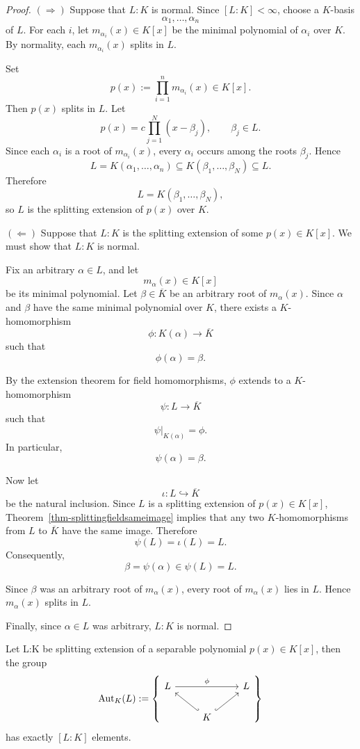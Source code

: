 \begin{proof}
$(\Rightarrow)$
Suppose that $L:K$ is normal. Since $[L:K]<\infty$, choose a
$K$-basis
\[
\alpha_1,\ldots,\alpha_n
\]
of $L$. For each $i$, let $m_{\alpha_i}(x)\in K[x]$ be the minimal
polynomial of $\alpha_i$ over $K$. By normality, each
$m_{\alpha_i}(x)$ splits in $L$.

Set
\[
p(x):=\prod_{i=1}^n m_{\alpha_i}(x)\in K[x].
\]
Then $p(x)$ splits in $L$. Let
\[
p(x)=c\prod_{j=1}^N(x-\beta_j),
\qquad \beta_j\in L.
\]
Since each $\alpha_i$ is a root of $m_{\alpha_i}(x)$, every
$\alpha_i$ occurs among the roots $\beta_j$. Hence
\[
L=K(\alpha_1,\ldots,\alpha_n)
   \subseteq K(\beta_1,\ldots,\beta_N)
   \subseteq L.
\]
Therefore
\[
L=K(\beta_1,\ldots,\beta_N),
\]
so $L$ is the splitting extension of $p(x)$ over $K$.

\medskip

\noindent
$(\Leftarrow)$
Suppose that $L:K$ is the splitting extension of some
$p(x)\in K[x]$. We must show that $L:K$ is normal.

Fix an arbitrary $\alpha\in L$, and let
\[
m_\alpha(x)\in K[x]
\]
be its minimal polynomial. Let $\beta\in\overline K$ be an arbitrary
root of $m_\alpha(x)$. Since $\alpha$ and $\beta$ have the same
minimal polynomial over $K$, there exists a $K$-homomorphism
\[
\phi:K(\alpha)\longrightarrow \overline K
\]
such that
\[
\phi(\alpha)=\beta.
\]

By the extension theorem for field homomorphisms, $\phi$ extends to a
$K$-homomorphism
\[
\psi:L\longrightarrow \overline K
\]
such that
\[
\psi|_{K(\alpha)}=\phi.
\]
In particular,
\[
\psi(\alpha)=\beta.
\]

Now let
\[
\iota:L\hookrightarrow\overline K
\]
be the natural inclusion. Since $L$ is a splitting extension of
$p(x)\in K[x]$, Theorem~\ref{thm-splittingfieldsameimage} implies that
any two $K$-homomorphisms from $L$ to $\overline K$ have the same
image. Therefore
\[
\psi(L)=\iota(L)=L.
\]
Consequently,
\[
\beta=\psi(\alpha)\in\psi(L)=L.
\]

Since $\beta$ was an arbitrary root of $m_\alpha(x)$, every root of
$m_\alpha(x)$ lies in $L$. Hence $m_\alpha(x)$ splits in $L$.

Finally, since $\alpha\in L$ was arbitrary, $L:K$ is normal.
\end{proof}
\begin{corollary} \label{cor-groupsize}
    Let L:K be splitting extension of a separable polynomial $p(x)\in K[x]$, then the group $$\mathrm{Aut}_K(L):=\left\{\begin{tikzcd}
	L && L \\
	& K
	\arrow["\phi", from=1-1, to=1-3]
	\arrow[hook', from=2-2, to=1-1]
	\arrow[hook, from=2-2, to=1-3]
\end{tikzcd}\right\}$$
has exactly $[L:K]$ elements.
\end{corollary}
